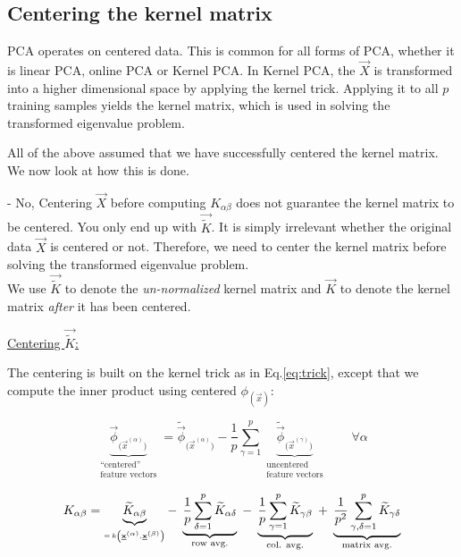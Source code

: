 \subsection{Centering the kernel matrix}

PCA operates on centered data. This is common for all forms  of PCA, 
whether it is linear PCA, online PCA or Kernel PCA.
In Kernel PCA, the $\vec X$ is transformed into a higher dimensional space by applying the kernel trick.
Applying it to all $p$ training samples yields the kernel matrix, which is used in solving the transformed eigenvalue problem.

All of the above assumed that we have successfully centered the kernel matrix. We now look at how this is done.


- No, Centering $\vec X$ before computing $K_{\alpha \beta}$ does not guarantee the kernel matrix to be centered. You only end up with $\vec{\widetilde K}$. 
It is simply irrelevant whether the original data $\vec X$ is centered or not. 
Therefore, we need to center the kernel matrix before solving the transformed eigenvalue problem.\\

We use $\vec{\widetilde K}$ to denote the \emph{un-normalized} kernel matrix and $\vec K$ 
to denote the kernel matrix \emph{after} it has been centered.

\underline{Centering $\vec{\widetilde K}$:}

The centering is built on the kernel trick as in Eq.\ref{eq:trick}, except that we compute the inner product using centered $\phi_{(\vec x)}$:

\begin{equation*}
	\underbrace{ \vec{\phi}_{\big( \vec{x}^{(\alpha)} \big)} }_{
		\substack{ 	\text{``centered''} \\
				\text{feature vectors}} }
	= \widetilde{\vec{\phi}}_{\big( \vec{x}^{(\alpha)} \big)}
		- \frac{1}{p} \sum\limits_{\gamma = 1}^p 
		\underbrace{ \widetilde{\vec{\phi}}_{\big( \vec{x}^{(\gamma)} 
				\big)} }_{
			\substack{ 	\text{uncentered} \\
					\text{feature vectors}} }
					\qquad \forall \alpha
\end{equation*}

\begin{equation*}
	K_{\alpha \beta} = \underbrace{\widetilde{K}_{\alpha \beta}}_{ _{= \, k \left ( \vec{x}^{(\alpha)},
			\vec{x}^{(\beta)} \right )}}
		- \;\underbrace{\frac{1}{p} \sum\limits_{\delta = 1}^p 
		\widetilde{K}_{\alpha \delta}}_\text{\scriptsize{row avg.}} 
		\; - \; \underbrace{\frac{1}{p} 
		\sum\limits_{\gamma = 1}^p 
		\widetilde{K}_{\gamma \beta}}_\text{\scriptsize{col. avg.}}
		\;+ \;\underbrace{\frac{1}{p^2} 
		\sum\limits_{\gamma, \delta = 1}^p 
		\widetilde{K}_{\gamma \delta}}_\text{\scriptsize{matrix avg.}}
\end{equation*}%


